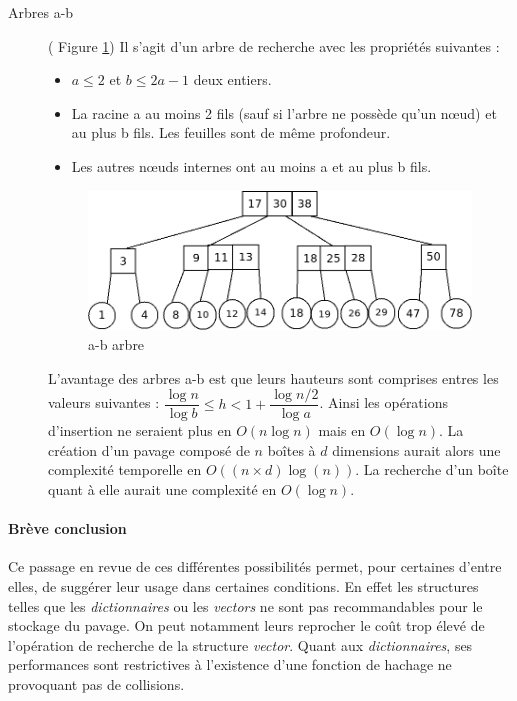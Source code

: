 \begin{description}
\item[Arbres a-b](\cf{} Figure \ref{fig:abtree})
Il s'agit d'un arbre de recherche avec les propriétés suivantes :
\begin{itemize}
\item
  $a\leq2$ et $b\leq 2a−1$ deux entiers.
\item
  La racine a au moins 2 fils (sauf si l'arbre ne possède qu'un nœud) et au plus b fils.
  Les feuilles sont de même profondeur.
\item
  Les autres nœuds internes ont au moins a et au plus b fils.
\end{itemize}

\begin{figure}[h!tbp]
  \centering
  \includegraphics[scale=0.40]{img/abtree}
  \caption{a-b arbre}
  \label{fig:abtree}
\end{figure}

L'avantage des arbres a-b est que leurs hauteurs  sont comprises entres les valeurs suivantes : $ \dfrac{\log{n}}{\log{b}}   \leq h  < 1 + \dfrac{\log{n/2}}{\log{a}}$. Ainsi les opérations d'insertion ne seraient plus en $O(n\log{n})$ mais en $O(\log{n})$. La création d'un pavage composé de $n$ boîtes à $d$ dimensions aurait alors une complexité temporelle en $O((n\times d)\log(n))$. La recherche d'un boîte quant à elle aurait une complexité en $O(\log{n})$.

\end{description}
\paragraph{Brève conclusion}
Ce passage en revue de ces différentes possibilités permet, pour certaines d'entre elles, de suggérer leur usage dans certaines conditions.  En effet les structures telles que les \emph{dictionnaires} ou les \emph{vectors} ne sont pas recommandables pour le stockage du pavage. On peut notamment leurs reprocher le coût trop élevé de l'opération de recherche de la structure \emph{vector}. Quant aux \emph{dictionnaires}, ses performances sont restrictives à l'existence d'une fonction de hachage ne provoquant pas de collisions. 

